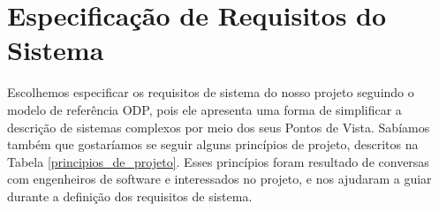 \chapter{Especificação de Requisitos do Sistema}
    Escolhemos especificar os requisitos de sistema do nosso projeto seguindo o modelo de referência ODP, pois ele apresenta uma forma de simplificar a descrição de sistemas complexos por meio dos seus Pontos de Vista.\cite{odppart1} Sabíamos também que gostaríamos se seguir alguns princípios de projeto, descritos na Tabela \ref{principios_de_projeto}. Esses princípios foram resultado de conversas com engenheiros de software e interessados no projeto, e nos ajudaram a guiar durante a definição dos requisitos de sistema.
    \begin{table}
        \centering
        \caption{Princípios de Projeto}
        \label{principios_de_projeto}
    \end{table}
